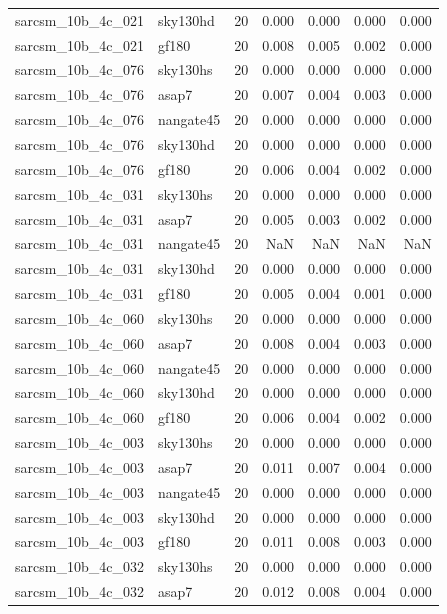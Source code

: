 \begin{tabular}{llrrrrr}
sarcsm\_10b\_4c\_021 & sky130hd & 20 & 0.000 & 0.000 & 0.000 & 0.000 \\
sarcsm\_10b\_4c\_021 & gf180 & 20 & 0.008 & 0.005 & 0.002 & 0.000 \\
sarcsm\_10b\_4c\_076 & sky130hs & 20 & 0.000 & 0.000 & 0.000 & 0.000 \\
sarcsm\_10b\_4c\_076 & asap7 & 20 & 0.007 & 0.004 & 0.003 & 0.000 \\
sarcsm\_10b\_4c\_076 & nangate45 & 20 & 0.000 & 0.000 & 0.000 & 0.000 \\
sarcsm\_10b\_4c\_076 & sky130hd & 20 & 0.000 & 0.000 & 0.000 & 0.000 \\
sarcsm\_10b\_4c\_076 & gf180 & 20 & 0.006 & 0.004 & 0.002 & 0.000 \\
sarcsm\_10b\_4c\_031 & sky130hs & 20 & 0.000 & 0.000 & 0.000 & 0.000 \\
sarcsm\_10b\_4c\_031 & asap7 & 20 & 0.005 & 0.003 & 0.002 & 0.000 \\
sarcsm\_10b\_4c\_031 & nangate45 & 20 & NaN & NaN & NaN & NaN \\
sarcsm\_10b\_4c\_031 & sky130hd & 20 & 0.000 & 0.000 & 0.000 & 0.000 \\
sarcsm\_10b\_4c\_031 & gf180 & 20 & 0.005 & 0.004 & 0.001 & 0.000 \\
sarcsm\_10b\_4c\_060 & sky130hs & 20 & 0.000 & 0.000 & 0.000 & 0.000 \\
sarcsm\_10b\_4c\_060 & asap7 & 20 & 0.008 & 0.004 & 0.003 & 0.000 \\
sarcsm\_10b\_4c\_060 & nangate45 & 20 & 0.000 & 0.000 & 0.000 & 0.000 \\
sarcsm\_10b\_4c\_060 & sky130hd & 20 & 0.000 & 0.000 & 0.000 & 0.000 \\
sarcsm\_10b\_4c\_060 & gf180 & 20 & 0.006 & 0.004 & 0.002 & 0.000 \\
sarcsm\_10b\_4c\_003 & sky130hs & 20 & 0.000 & 0.000 & 0.000 & 0.000 \\
sarcsm\_10b\_4c\_003 & asap7 & 20 & 0.011 & 0.007 & 0.004 & 0.000 \\
sarcsm\_10b\_4c\_003 & nangate45 & 20 & 0.000 & 0.000 & 0.000 & 0.000 \\
sarcsm\_10b\_4c\_003 & sky130hd & 20 & 0.000 & 0.000 & 0.000 & 0.000 \\
sarcsm\_10b\_4c\_003 & gf180 & 20 & 0.011 & 0.008 & 0.003 & 0.000 \\
sarcsm\_10b\_4c\_032 & sky130hs & 20 & 0.000 & 0.000 & 0.000 & 0.000 \\
sarcsm\_10b\_4c\_032 & asap7 & 20 & 0.012 & 0.008 & 0.004 & 0.000 \\

\end{tabular}
